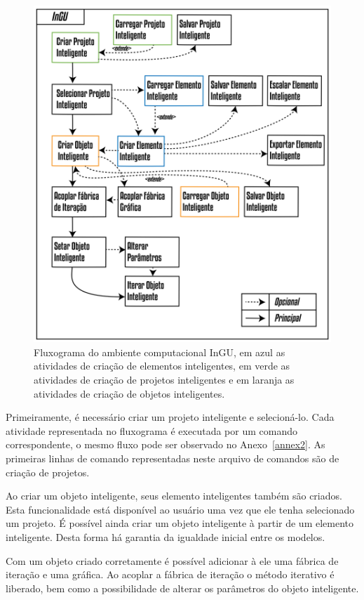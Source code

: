 \begin{figure}[!htbp]
	\centering
	\includegraphics[width=\linewidth]{Figures/CasoDeUso@16x.png}
	\caption{Fluxograma do ambiente computacional InGU, em azul as atividades de criação de elementos inteligentes, em verde as atividades de criação de projetos inteligentes e em laranja as atividades de criação de objetos inteligentes.}
	\label{fig:caso_uso}
\end{figure}

Primeiramente, é necessário criar um projeto inteligente e selecioná-lo. Cada atividade representada no fluxograma é executada por um comando correspondente, o mesmo fluxo pode ser observado no Anexo~\ref{annex2}. As primeiras linhas de comando representadas neste arquivo de comandos são de criação de projetos.

Ao criar um objeto inteligente, seus elemento inteligentes também são criados. Esta funcionalidade está disponível ao usuário uma vez que ele tenha selecionado um projeto. É possível ainda criar um objeto inteligente à partir de um elemento inteligente. Desta forma há garantia da igualdade inicial entre os modelos.

Com um objeto criado corretamente é possível adicionar à ele uma fábrica de iteração e uma gráfica. Ao acoplar a fábrica de iteração o método iterativo é liberado, bem como a possibilidade de alterar os parâmetros do objeto inteligente.

